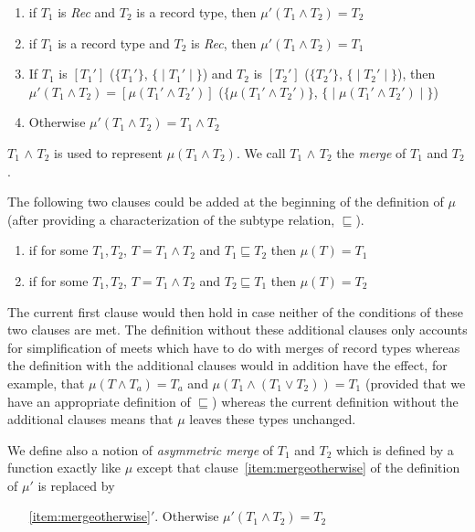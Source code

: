 \begin{enumerate}
\begin{enumerate}
\end{enumerate} 

\item if $T_1$ is \textit{Rec} and $T_2$ is a record type, then
  $\mu'(T_1\wedge T_2)=T_2$

\item if $T_1$ is a record type  and $T_2$ is \textit{Rec}, then
  $\mu'(T_1\wedge T_2)=T_1$

\item If $T_1$ is $[T_1']$ ($\{T_1'\}$, $\{\!\mid T_1'\mid\!\}$) and
  $T_2$ is $[T_2']$ ($\{T_2'\}$, $\{\!\mid T_2'\mid\!\}$), then
  $\mu'(T_1\wedge T_2)=[\mu(T_1'\wedge T_2')]$ ($\{\mu(T_1'\wedge
  T_2')\}$, $\{\!\mid\mu(T_1'\wedge T_2')\mid\!\}$)
   
 
\item \label{item:mergeotherwise} Otherwise $\mu'(T_1\wedge T_2)=T_1\wedge T_2$ 
 
\end{enumerate} 

$T_1$ \d{$\wedge$} $T_2$ is used to represent $\mu(T_1\wedge T_2)$.
We call  $T_1$ \d{$\wedge$} $T_2$ the \textit{merge} of $T_1$ and $T_2$.   

The following two clauses could be added at
the beginning of the definition of $\mu$ (after providing a
characterization of the subtype relation, $\sqsubseteq$).
\begin{enumerate} 
 
\item if for some $T_1,T_2$, $T=T_1\wedge T_2$ and $T_1\sqsubseteq T_2$
  then $\mu(T)=T_1$ 
 
\item if for some $T_1,T_2$, $T=T_1\wedge T_2$ and $T_2\sqsubseteq T_1$
  then $\mu(T)=T_2$ 
 
\end{enumerate} 

The current first clause would then hold in case neither of the
conditions of these two clauses are met.  The definition without these
additional clauses only accounts for simplification of meets which
have to do with merges of record types whereas the definition with the
additional clauses would in addition have the effect, for example, that
$\mu(T\wedge T_a)=T_a$ and $\mu(T_1\wedge(T_1\vee T_2))= T_1$
(provided that we have an appropriate definition of $\sqsubseteq$)
whereas the current definition without the additional clauses means
that $\mu$ 
leaves these types unchanged.

We define also a notion of \textit{asymmetric merge} of $T_1$ and
$T_2$ which is defined by a function exactly like $\mu$ except that
clause~\ref{item:mergeotherwise} of the definition of $\mu'$ is replaced by 
\begin{enumerate} 
 
\item[\ref{item:mergeotherwise}$'$.] Otherwise $\mu'(T_1\wedge T_2)=T_2$ 
 
\end{enumerate} 
  
